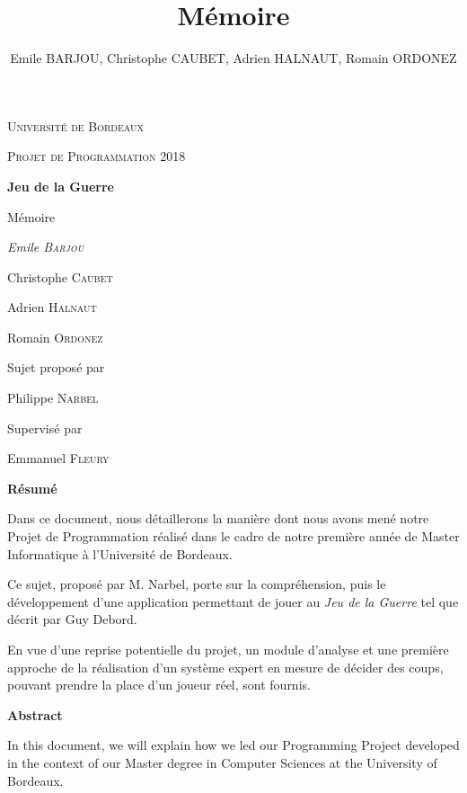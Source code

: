 \documentclass[a4paper]{report}
\begin{document}
\title{Mémoire}
\author{Emile BARJOU, Christophe CAUBET, Adrien HALNAUT, Romain ORDONEZ}

%
\begin{titlepage}
\centering
{\scshape\LARGE Université de Bordeaux \par}
\vspace{0.75cm}
{\scshape\Large Projet de Programmation 2018\par}
\vspace{1.5cm}
{\Huge\bfseries Jeu de la Guerre\par}
\vspace{0.5cm}
{\Large Mémoire\par}
\vspace{2.5cm}
{\Large\itshape Emile \textsc{Barjou}\par Christophe \textsc{Caubet} \par Adrien \textsc{Halnaut}\par Romain \textsc{Ordonez} \par}
\vfill
Sujet proposé par\par
Philippe {\scshape Narbel}\par
Supervisé par\par
Emmanuel {\scshape Fleury}

\vfill
\end{titlepage}

\vspace*{\fill}
\begin{center}
{\bf Résumé}
\end{center}
Dans ce document, nous détaillerons la manière dont nous avons mené notre Projet de Programmation réalisé dans le cadre de notre première année de Master Informatique à l'Université de Bordeaux.

Ce sujet, proposé par M. Narbel, porte sur la compréhension, puis le développement d'une application permettant de jouer au \textit{Jeu de la Guerre} tel que décrit par Guy Debord.

En vue d'une reprise potentielle du projet, un module d'analyse et une première approche de la réalisation d'un système expert en mesure de décider des coups, pouvant prendre la place d'un joueur réel, sont fournis.

\vspace*{\fill}

\begin{center}
{\bf Abstract}
\end{center}
In this document, we will explain how we led our Programming Project developed in the context of our Master degree in Computer Sciences at the University of Bordeaux.
\end{document}
